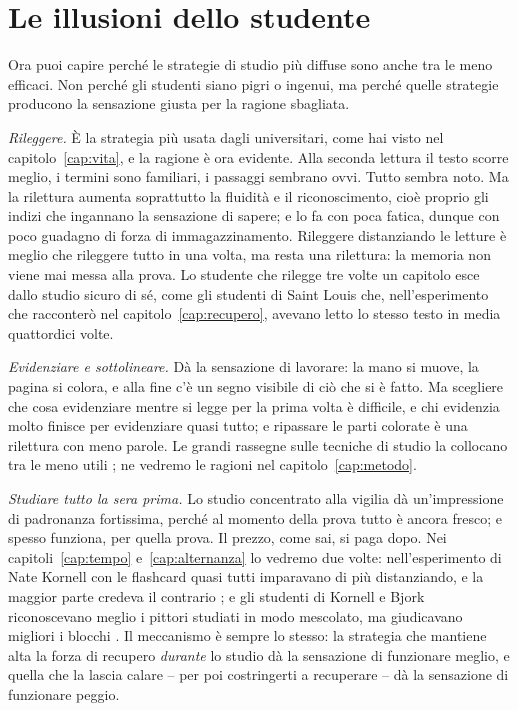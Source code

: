 \section{Le illusioni dello studente}

Ora puoi capire perché le strategie di studio più diffuse sono anche
tra le meno efficaci. Non perché gli studenti siano pigri o ingenui, ma
perché quelle strategie producono la sensazione giusta per la ragione
sbagliata.

\emph{Rileggere.} È la strategia più usata dagli universitari, come
hai visto nel capitolo~\ref{cap:vita}, e la ragione è ora evidente. Alla
seconda lettura il testo scorre meglio, i termini sono familiari, i
passaggi sembrano ovvi. Tutto sembra noto. Ma la rilettura aumenta
soprattutto la fluidità e il riconoscimento, cioè proprio gli indizi
che ingannano la sensazione di sapere; e lo fa con poca fatica, dunque
con poco guadagno di forza di immagazzinamento. Rileggere distanziando
le letture è meglio che rileggere tutto in una volta, ma resta una
rilettura: la memoria non viene mai messa alla prova. Lo studente che
rilegge tre volte un capitolo esce dallo studio sicuro di sé, come gli
studenti di Saint Louis che, nell'esperimento che racconterò nel
capitolo~\ref{cap:recupero}, avevano letto lo stesso testo in media
quattordici volte.

\emph{Evidenziare e sottolineare.} Dà la sensazione di lavorare: la
mano si muove, la pagina si colora, e alla fine c'è un segno visibile
di ciò che si è fatto. Ma scegliere che cosa evidenziare mentre si
legge per la prima volta è difficile, e chi evidenzia molto finisce per
evidenziare quasi tutto; e ripassare le parti colorate è una rilettura
con meno parole. Le grandi rassegne sulle tecniche di studio la
collocano tra le meno utili \parencite{dunlosky2013}; ne vedremo le
ragioni nel capitolo~\ref{cap:metodo}.

\emph{Studiare tutto la sera prima.} Lo studio concentrato alla vigilia
dà un'impressione di padronanza fortissima, perché al momento della
prova tutto è ancora fresco; e spesso funziona, per quella prova. Il
prezzo, come sai, si paga dopo. Nei capitoli~\ref{cap:tempo}
e~\ref{cap:alternanza} lo vedremo due volte: nell'esperimento di Nate
Kornell con le flashcard quasi tutti imparavano di più distanziando, e
la maggior parte credeva il contrario \parencite{kornell2009}; e gli
studenti di Kornell e Bjork riconoscevano meglio i pittori studiati in
modo mescolato, ma giudicavano migliori i blocchi
\parencite{kornell2008}. Il meccanismo è sempre lo stesso: la strategia
che mantiene alta la forza di recupero \emph{durante} lo studio dà la
sensazione di funzionare meglio, e quella che la lascia calare -- per
poi costringerti a recuperare -- dà la sensazione di funzionare peggio.

